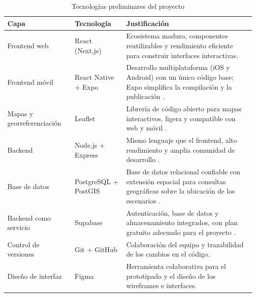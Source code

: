 \begin{table}[H]
  \centering
  \caption{Tecnolog\'ias preliminares del proyecto}
  \begin{tablaAPA}
    \begin{tabular}{@{}p{2.8cm}p{4.6cm}p{8.2cm}@{}}
      \toprule
      \textbf{Capa} & \textbf{Tecnolog\'ia} & \textbf{Justificaci\'on} \\
      \midrule
      Frontend web & React (Next.js) &
      Ecosistema maduro, componentes reutilizables y rendimiento eficiente
      para construir interfaces interactivas. \\
      \addlinespace
      Frontend m\'ovil & React Native + Expo &
      Desarrollo multiplataforma (iOS y Android) con un \'unico c\'odigo base;
      Expo simplifica la compilaci\'on y la publicaci\'on \citep{reactnative,
      expo}. \\
      \addlinespace
      Mapas y georreferenciaci\'on & Leaflet &
      Librer\'ia de c\'odigo abierto para mapas interactivos, ligera y
      compatible con web y m\'ovil \citep{leaflet, longley2015}. \\
      \addlinespace
      Backend & Node.js + Express &
      Mismo lenguaje que el frontend, alto rendimiento y amplia comunidad de
      desarrollo \citep{nodejs}. \\
      \addlinespace
      Base de datos & PostgreSQL + PostGIS &
      Base de datos relacional confiable con extensi\'on espacial para
      consultas geogr\'aficas sobre la ubicaci\'on de los escenarios
      \citep{postgresql}. \\
      \addlinespace
      Backend como servicio & Supabase &
      Autenticaci\'on, base de datos y almacenamiento integrados, con plan
      gratuito adecuado para el proyecto \citep{supabase}. \\
      \addlinespace
      Control de versiones & Git + GitHub &
      Colaboraci\'on del equipo y trazabilidad de los cambios en el c\'odigo. \\
      \addlinespace
      Dise\~no de interfaz & Figma &
      Herramienta colaborativa para el prototipado y el dise\~no de los
      wireframes e interfaces. \\
      \bottomrule
    \end{tabular}
  \end{tablaAPA}
\end{table}
